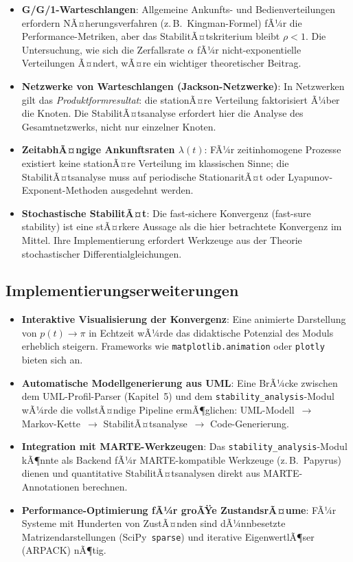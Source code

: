 ﻿\documentclass[a4paper,12pt]{report}
\theoremstyle{definition}
\begin{document}
\begin{itemize}
	\item \textbf{G/G/1-Warteschlangen}: Allgemeine Ankunfts- und
	Bedienverteilungen erfordern NÃ¤herungsverfahren (z.\,B.\ 
	Kingman-Formel) fÃ¼r die Performance-Metriken, aber das
	StabilitÃ¤tskriterium bleibt $\rho < 1$.  Die Untersuchung,
	wie sich die Zerfallsrate $\alpha$ fÃ¼r nicht-exponentielle
	Verteilungen Ã¤ndert, wÃ¤re ein wichtiger theoretischer Beitrag.
	
	\item \textbf{Netzwerke von Warteschlangen (Jackson-Netzwerke)}:
	In Netzwerken gilt das \emph{Produktformresultat}: die
	stationÃ¤re Verteilung faktorisiert Ã¼ber die Knoten.  Die
	StabilitÃ¤tsanalyse erfordert hier die Analyse des
	Gesamtnetzwerks, nicht nur einzelner Knoten.
	
	\item \textbf{ZeitabhÃ¤ngige Ankunftsraten $\lambda(t)$}: FÃ¼r
	zeitinhomogene Prozesse existiert keine stationÃ¤re
	Verteilung im klassischen Sinne; die StabilitÃ¤tsanalyse
	muss auf periodische StationaritÃ¤t oder
	Lyapunov-Exponent-Methoden ausgedehnt werden.
	
	\item \textbf{Stochastische StabilitÃ¤t}: Die fast-sichere
	Konvergenz (fast-sure stability) ist eine stÃ¤rkere Aussage
	als die hier betrachtete Konvergenz im Mittel.  Ihre
	Implementierung erfordert Werkzeuge aus der Theorie
	stochastischer Differentialgleichungen.
\end{itemize}

\subsection{Implementierungserweiterungen}

\begin{itemize}
	\item \textbf{Interaktive Visualisierung der Konvergenz}: Eine
	animierte Darstellung von $p(t) \to \pi$ in Echtzeit wÃ¼rde
	das didaktische Potenzial des Moduls erheblich steigern.
	Frameworks wie \texttt{matplotlib.animation} oder
	\texttt{plotly} bieten sich an.
	
	\item \textbf{Automatische Modellgenerierung aus UML}: Eine
	BrÃ¼cke zwischen dem UML-Profil-Parser (Kapitel~5) und dem
	\texttt{stability\_analysis}-Modul wÃ¼rde die vollstÃ¤ndige
	Pipeline ermÃ¶glichen: UML-Modell~$\to$ Markov-Kette~$\to$
	StabilitÃ¤tsanalyse~$\to$ Code-Generierung.
	
	\item \textbf{Integration mit MARTE-Werkzeugen}: Das
	\texttt{stability\_analysis}-Modul kÃ¶nnte als Backend fÃ¼r
	MARTE-kompatible Werkzeuge (z.\,B.\ Papyrus) dienen und
	quantitative StabilitÃ¤tsanalysen direkt aus MARTE-Annotationen
	berechnen.
	
	\item \textbf{Performance-Optimierung fÃ¼r groÃŸe ZustandsrÃ¤ume}:
	FÃ¼r Systeme mit Hunderten von ZustÃ¤nden sind dÃ¼nnbesetzte
	Matrizendarstellungen (SciPy~\texttt{sparse}) und
	iterative EigenwertlÃ¶ser (ARPACK) nÃ¶tig.
\end{itemize}
\end{document}
